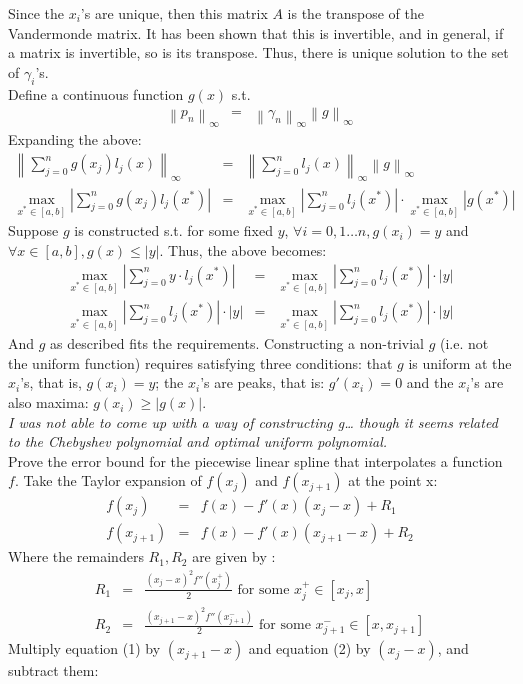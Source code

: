 \documentclass{article}
\newcommand{\ea}[1]{\begin{eqnarray*}#1\end{eqnarray*}}
\newcommand{\eanum}[1]{\begin{eqnarray}#1\end{eqnarray}}
\newcommand{\norminf}[1]{\left\|{#1}\right\|_\infty}
\begin{document}
Since the $x_i$'s are unique, then this matrix $A$ is the transpose of the Vandermonde matrix.  It has been shown that this is invertible, and in general, if a matrix is 
invertible, so is its transpose\cite{mw:transpose}.  Thus, there is unique solution to the set of $\gamma_i$'s.
\\
 Define a continuous function $g(x)$ s.t.
\ea{
	\norminf{ p_n } &=& \norminf{\gamma_n}\norminf{g}
}
 Expanding the above:
\ea{
	\norminf{ \sum_{j=0}^n g(x_j)l_j(x) } &=& \norminf{ \sum_{j=0}^n l_j(x)}\norminf{g}\\
	\max_{x^*\in[a,b]} \left| \sum_{j=0}^n g(x_j)l_j(x^*) \right| &=& 
	\max_{x^*\in[a,b]} \left| \sum_{j=0}^n l_j(x^*) \right| 
	\cdot \max_{x^*\in[a,b]} \left| g(x^*) \right|
}
Suppose $g$ is constructed s.t. for some fixed $y$, $\forall i=0,1\dots n, g(x_i)=y$
and $\forall x\in[a,b], g(x)\le |y|$.  Thus, the above becomes:
\ea{
	\max_{x^*\in[a,b]} \left| \sum_{j=0}^n y\cdot l_j(x^*) \right| &=&
    \max_{x^*\in[a,b]} \left| \sum_{j=0}^n l_j(x^*) \right| \cdot |y| \\
	\max_{x^*\in[a,b]} \left| \sum_{j=0}^n l_j(x^*) \right| \cdot |y| &=&
    \max_{x^*\in[a,b]} \left| \sum_{j=0}^n l_j(x^*) \right| \cdot |y|
}
And $g$ as described fits the requirements.  Constructing a non-trivial $g$ (i.e. not the uniform function) requires satisfying three conditions: that $g$ is uniform at the $x_i$'s, that is, $g(x_i)=y$; the $x_i$'s are peaks, that is: $g'(x_i)=0$ and the $x_i$'s are also maxima:
$g(x_i)\ge |g(x)|$.  
\\ \textit{I was not able to come up with a way of constructing g\dots 
though it seems related to the Chebyshev polynomial and optimal uniform polynomial.}
\\
 Prove the error bound for the piecewise linear spline that interpolates a function $f$.
Take the Taylor expansion of $f(x_j)$ and $f(x_{j+1})$ at the point x:
\eanum{
	f(x_{j}) &=& f(x) - f'(x)(x_j-x) + R_1 \\
	f(x_{j+1}) &=& f(x) - f'(x)(x_{j+1}-x) + R_2
}
Where the remainders $R_1,R_2$ are given by \cite{mw:taylor}:
\eanum{
R_1 &=& \frac{ (x_j-x)^2 f''(x_j^+) }{2} \textrm{ for some $x_j^{+} \in [x_j,x]$ }\\
R_2 &=& \frac{ (x_{j+1}-x)^2 f''(x_{j+1}^{-}) }{2} \textrm{ for some $x_{j+1}^{-} \in [x,x_{j+1}]$}
}	
Multiply equation (1) by $(x_{j+1}-x)$ and equation (2) by $(x_{j}-x)$, and subtract them:
\end{document}
